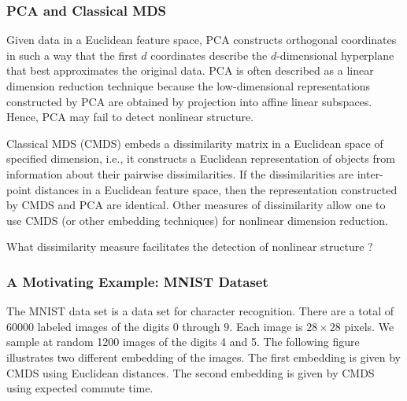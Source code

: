 \documentclass[professionalfonts, hyperref={pdfpagelabels=false,
  colorlinks=true, linkcolor=purple}]{beamer}
\begin{document}
\begin{frame}
  \frametitle{PCA and Classical MDS}
  Given data in a Euclidean feature space, PCA constructs orthogonal
  coordinates in such a way that the first $d$ coordinates describe
  the $d$-dimensional hyperplane that best approximates the original
  data. PCA is often described as a \alert{linear} dimension reduction
  technique because the low-dimensional representations constructed by
  PCA are obtained by projection into affine linear
  subspaces. Hence, PCA may fail to detect nonlinear structure.
  
\vskip10pt Classical MDS (CMDS) embeds a dissimilarity matrix in a
  Euclidean space of specified dimension, i.e., it constructs a
  Euclidean representation of objects from information about their
  pairwise dissimilarities. If the dissimilarities are inter-point
  distances in a Euclidean feature space, then the representation
  constructed by CMDS and PCA are identical. Other measures of dissimilarity
  allow one to use CMDS (or other embedding techniques) for
  \alert{nonlinear} dimension reduction. 
  
\vskip10pt What dissimilarity measure facilitates the detection of
nonlinear structure ?
\end{frame}
  
\begin{frame}
  \frametitle{A Motivating Example: MNIST Dataset}
  \label{motivating_example}
  The MNIST data set \cite{lecun98:_gradien} is a data set for
  character recognition. There are a total of $60000$ labeled images
  of the digits $0$ through $9$. Each image is $28 \times 28$
  pixels. We sample at random 1200 images of the digits 4 and 5. The
  following figure illustrates two different embedding of the
  images. The first embedding is given by CMDS using Euclidean
  distances. The second embedding is
  given by CMDS using expected commute time. 
  \begin{figure}
    \centering
  \end{figure}
\end{frame}
\end{document}
